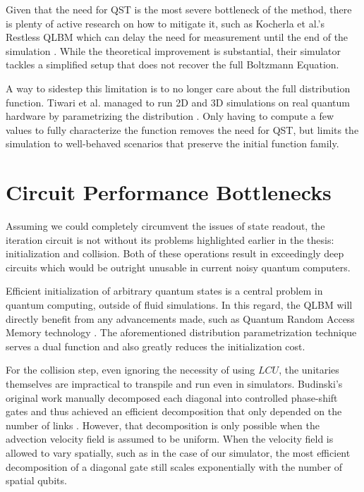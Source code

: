 Given that the need for QST is the most severe bottleneck of the method, there is plenty of active research on how to mitigate it, such as Kocherla et al.'s Restless QLBM which can delay the need for measurement until the end of the simulation \cite{kocherla2024fully}.
While the theoretical improvement is substantial, their simulator tackles a simplified setup that does not recover the full Boltzmann Equation.

A way to sidestep this limitation is to no longer care about the full distribution function.
Tiwari et al. managed to run 2D and 3D simulations on real quantum hardware by parametrizing the distribution \cite{tiwari2025algorithmic}.
Only having to compute a few values to fully characterize the function removes the need for QST, but limits the simulation to well-behaved scenarios that preserve the initial function family.

\section{Circuit Performance Bottlenecks}

Assuming we could completely circumvent the issues of state readout, the iteration circuit is not without its problems highlighted earlier in the thesis: initialization and collision.
Both of these operations result in exceedingly deep circuits which would be outright unusable in current noisy quantum computers.

Efficient initialization of arbitrary quantum states is a central problem in quantum computing, outside of fluid simulations.
In this regard, the QLBM will directly benefit from any advancements made, such as Quantum Random Access Memory technology \cite{giovannetti2008quantum}.
The aforementioned distribution parametrization technique serves a dual function and also greatly reduces the initialization cost.

For the collision step, even ignoring the necessity of using $LCU$, the unitaries themselves are impractical to transpile and run even in simulators.
Budinski's original work manually decomposed each diagonal into controlled phase-shift gates and thus achieved an efficient decomposition that only depended on the number of links \cite{budinski2021quantum}.
However, that decomposition is only possible when the advection velocity field is assumed to be uniform. 
When the velocity field is allowed to vary spatially, such as in the case of our simulator, the most efficient decomposition of a diagonal gate still scales exponentially with the number of spatial qubits.

